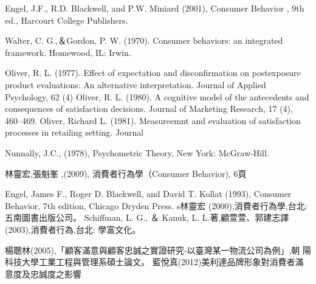 \documentclass[a4paper,12pt]{report}
\begin{document}
\begin{thebibliography}{1}
Engel, J.F., R.D. Blackwell, and P.W. Miniard (2001), Consumer Behavior , 9th
ed., Harcourt College Publishers.

Walter, C. G.,＆Gordon, P. W. (1970). Consumer behaviors: an integrated framework. Homewood, IL: Irwin.

Oliver, R. L. (1977). Effect of expectation and disconfirmation on postexposure product
evaluations: An alternative interpretation. Journal of Applied Psychology, 62 (4)
Oliver, R. L. (1980). A cognitive model of the antecedents and consequences of satisfaction
decisions. Journal of Marketing Research, 17 (4), 460–469.
Oliver, Richard L. (1981). Measureemnt and evaluation of satisfaction processes in retailing setting. Journal


Nunnally, J.C., (1978), Psychometric Theory, New York: McGraw-Hill. 

林靈宏,張魁峯 ,(2009), 消費者行為學（Consumer Behavior), 6頁

Engel, James F., Roger D. Blackwell, and David T. Kollat (1993), Consumer
Behavior, 7th edition, Chicago Dryden Press.
s林靈宏 (2000),消費者行為學,台北:五南圖書出版公司。
Schiffman, L. G.,  ＆ Kanuk, L. L.著,顧萱萱、郭建志譯 (2003),消費者行為,台北: 學富文化。

楊聰林(2005),「顧客滿意與顧客忠誠之實證研究-以臺灣某一物流公司為例」,朝
  陽科技大學工業工程與管理系碩士論文。
藍悅真(2012)美利達品牌形象對消費者滿意度及忠誠度之影響
\end{thebibliography}
\clearpage
\end{document}
